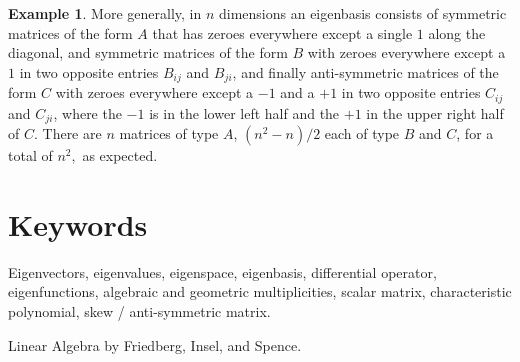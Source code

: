 \documentclass[12pt]{article}
\theoremstyle{plain}
\theoremstyle{definition}
\newtheorem{example}[theorem]{Example}
\theoremstyle{remark}
\begin{document}
\begin{example}
More generally, in $n$ dimensions an eigenbasis consists of symmetric matrices of the form $A$ that has zeroes everywhere except a single $1$ along the diagonal, and symmetric matrices of the form $B$ with zeroes everywhere except a $1$ in two opposite entries $B_{ij}$ and $B_{ji}$, and finally anti-symmetric matrices of the form $C$ with zeroes everywhere except a $-1$ and a $+1$ in two opposite entries $C_{ij}$ and $C_{ji}$, where the $-1$ is in the lower left half and the $+1$ in the upper right half of $C$. There are $n$ matrices of type $A$, $(n^2 - n) / 2$ each of type $B$ and $C$, for a total of $n^2,$ as expected.
\end{example}

\section*{Keywords}

Eigenvectors, eigenvalues, eigenspace, eigenbasis, differential operator, eigenfunctions, algebraic and geometric multiplicities, scalar matrix, characteristic polynomial, skew / anti-symmetric matrix.

\begin{thebibliography}{99}

 Linear Algebra by Friedberg, Insel, and Spence.

\end{thebibliography}
\end{document}
